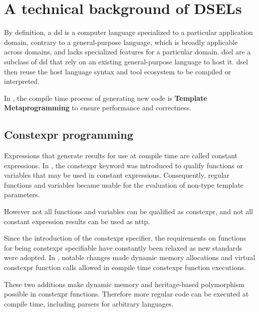\documentclass[../main]{subfiles}
\begin{document}

\section{
  A technical background of \cpp DSELs
}

By definition, a \gls{dsl} is a computer language
specialized to a particular application domain, contrary to a general-purpose
language, which is broadly applicable across domains, and lacks specialized
features for a particular domain. \gls{dsel}\acrpluralsuffix{}
are a subclass of \gls{dsl} that rely on an existing general-purpose language to host
it. \gls{dsel}\acrpluralsuffix{} then reuse the host language syntax and tool ecosystem to be compiled
or interpreted.

In \cpp, the compile time process of generating new code is
\textbf{Template Metaprogramming} to ensure performance and correctness.


\subsection{
  Constexpr programming
}
\label{lbl:constexpr-programming}

Expressions that generate results for use at compile time are called
constant expressions. In , the \gls{constexpr} keyword was introduced
to qualify functions or variables that may be used in constant expressions.
Consequently, regular functions and variables became usable for the evaluation
of non-type template parameters.

However not all functions and variables can be qualified as \gls{constexpr},
and not all constant expression results can be used as \gls{nttp}\acrpluralsuffix{}.

Since the introduction of the \gls{constexpr} specifier, the requirements on
functions for being \gls{constexpr} specifiable have constantly been relaxed as new
\cpp standards were adopted. In , notable changes made dynamic memory
allocations\cite{constexpr-memory} and virtual \gls{constexpr} function
calls\cite{virtual-constexpr} allowed in compile time \gls{constexpr} function
executions.

These two additions make dynamic memory and heritage-based polymorphism
possible in \gls{constexpr} functions. Therefore more regular \cpp code can be
executed at compile time, including parsers for arbitrary languages.
\end{document}

